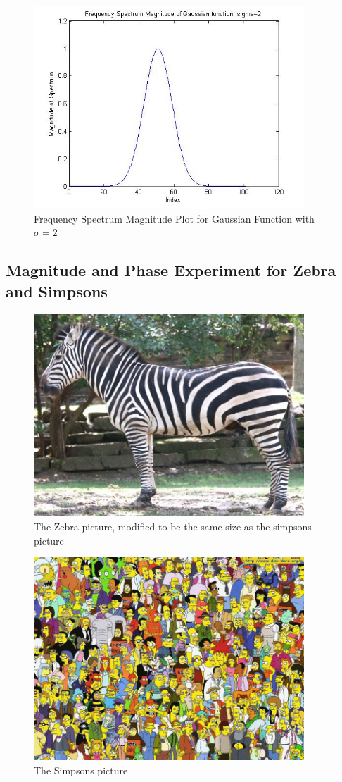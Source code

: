 \documentclass[11pt,psfig]{article}
\begin{document}
\begin{figure}[H]
\centering
\includegraphics[height=3in]{prob6plot_freqGauss2.jpg}
\caption{Frequency Spectrum Magnitude Plot for Gaussian Function with $\sigma=2$}
\end{figure}

\subsection*{Magnitude and Phase Experiment for Zebra and Simpsons}

\begin{figure}[H]
\centering
\includegraphics[height=3in]{zebraMod.jpg}
\caption{The Zebra picture, modified to be the same size as the simpsons picture}
\end{figure}

\begin{figure}[H]
\centering
\includegraphics[height=3in]{simpsons.jpg}
\caption{The Simpsons picture}
\end{figure}
\end{document}
